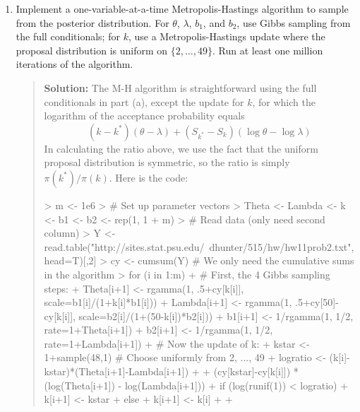\documentclass{article}
\begin{document}
\begin{enumerate}
\begin{enumerate}
    \item Implement a one-variable-at-a-time Metropolis-Hastings algorithm to
    sample from the posterior distribution. For $\theta$, $\lambda$, $b_1$, and
    $b_2$, use Gibbs sampling from the full conditionals; for $k$, use a
    Metropolis-Hastings update where the proposal distribution is uniform on
    $\{2, \ldots, 49\}$. Run at least one million iterations of the algorithm.
    \begin{quotation}{\bf Solution:}
    The M-H algorithm is straightforward using the full conditionals in part (a), except 
    the update for $k$, for which the logarithm of the acceptance probability equals
    \[
    (k-k^*)(\theta-\lambda) + (S_{k^*}-S_k)(\log \theta - \log\lambda)
    \]
    In calculating the ratio above, we use the fact that the uniform proposal
    distribution is symmetric, so the ratio is simply $\pi(k^*)/\pi(k)$.
    Here is the code:
\begin{Schunk}
\begin{Sinput}
> m <- 1e6
> # Set up parameter vectors
> Theta <- Lambda <- k <- b1 <- b2 <- rep(1, 1 + m)
> # Read data (only need second column)
> Y <- read.table("http://sites.stat.psu.edu/~dhunter/515/hw/hw11prob2.txt", head=T)[,2]
> cy <- cumsum(Y) # We only need the cumulative sums in the algorithm
> for (i in 1:m) {
+   # First, the 4 Gibbs sampling steps:
+   Theta[i+1] <- rgamma(1, .5+cy[k[i]], scale=b1[i]/(1+k[i]*b1[i]))
+   Lambda[i+1] <- rgamma(1, .5+cy[50]-cy[k[i]], scale=b2[i]/(1+(50-k[i])*b2[i]))
+   b1[i+1] <- 1/rgamma(1, 1/2, rate=1+Theta[i+1])
+   b2[i+1] <- 1/rgamma(1, 1/2, rate=1+Lambda[i+1])
+   # Now the update of k:
+   kstar <- 1+sample(48,1) # Choose uniformly from 2, ..., 49
+   logratio <- (k[i]-kstar)*(Theta[i+1]-Lambda[i+1]) + 
+                    (cy[kstar]-cy[k[i]]) * (log(Theta[i+1]) - log(Lambda[i+1]))
+   if (log(runif(1)) < logratio) {
+     k[i+1] <- kstar
+   } else {
+     k[i+1] <- k[i]
+   }
+ }
\end{Sinput}
\end{Schunk}
    \end{quotation}
    

\end{enumerate}
\end{enumerate}
\end{document}
